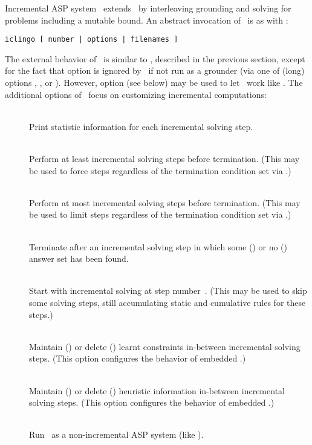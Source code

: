 Incremental ASP system \iclingo\ extends \clingo\ by interleaving
grounding and solving for problems including a mutable bound.
An abstract invocation of \iclingo\ is as with \clingo:
%
\begin{lstlisting}[numbers=none]
iclingo [ number | options | filenames ]
\end{lstlisting}
%
The external behavior of \iclingo\ is similar to \clingo,
described in the previous section, except for the fact that
option  is ignored by \iclingo\ if not run as a grounder
(via one of (long) options , , or ).
However, option  (see below) may be used to let \iclingo\
work like \clingo.
The additional options of \iclingo\ focus on customizing
incremental computations:
%
\begin{description}
\item[]~\\
Print statistic information for each incremental solving step.
\item[]~\\
Perform at least  incremental solving steps before termination.
(This may be used to force steps regardless of the termination condition
 set via \code{--istop}.)
\item[]~\\
Perform at most  incremental solving steps before termination.
(This may be used to limit steps regardless of the termination condition
 set via \code{--istop}.)
\item[]~\\
Terminate after an incremental solving step 
in which some () or no ()
answer set has been found.
\item[]~\\
Start with incremental solving at step number~.
(This may be used to skip some solving steps,
 still accumulating static and cumulative rules for these steps.)
\item[\code{--ilearnt=keep|forget}]~\\
Maintain () or delete () learnt constraints
in-between incremental solving steps.
(This option configures the behavior of embedded \clasp.)
\item[]~\\
Maintain () or delete () heuristic information
in-between incremental solving steps.
(This option configures the behavior of embedded \clasp.)
\item[]~\\
Run \iclingo\ as a non-incremental ASP system (like \clingo).
\end{description}
